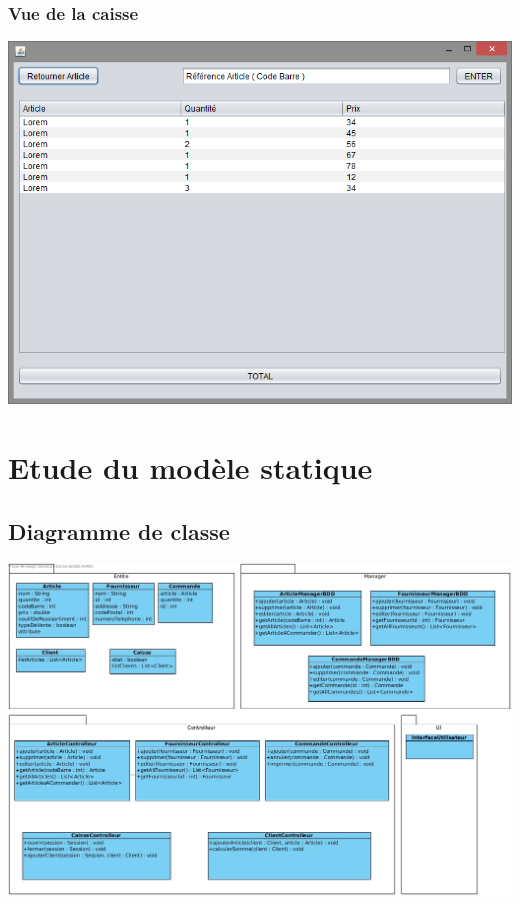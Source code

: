 \subsection{Vue de la caisse}
\begin{center}
	\includegraphics[width=14cm]{CaisseView.png}
\end{center}


\chapter{Etude du modèle statique}

\section{Diagramme de classe}
\begin{center}
	\includegraphics[width=14cm]{DiagrammeDeClasseEbauche.jpg}
\end{center}

